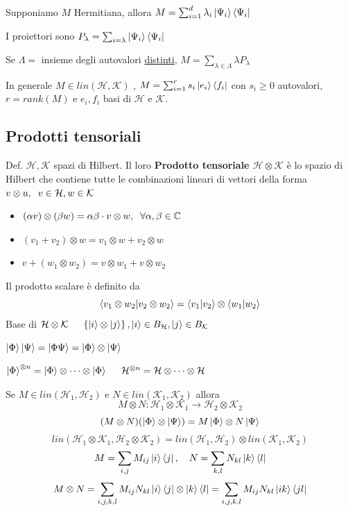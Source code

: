 \documentclass{report}
\begin{document}
\medskip
Supponiamo $M$ Hermitiana, allora $M = \sum^d_{i=1} \lambda_i \ket{\Psi_i}\bra{\Psi_i}$

\medskip
I proiettori sono $P_\lambda = \sum_{i=\lambda} \ket{\Psi_i}\bra{\Psi_i}$

\medskip
Se $\Lambda =$ insieme degli autovalori \underline{distinti}, $M = \sum_{\lambda\in \Lambda} \lambda P_\lambda$ 

\medskip
In generale $M\in\textit{lin}(\mathcal{H,K})$ , $M = \sum^r_{i=1} s_i\ket{e_i}\bra{f_i}$ con $s_i\ge0$ autovalori, $r = \textit{rank}(M)$ e $e_i,f_i$ basi di $\mathcal{H}$ e $\mathcal{K}$.

\subsection{Prodotti tensoriali}
Def. $\mathcal{H,K}$ spazi di Hilbert. Il loro \textbf{Prodotto tensoriale $\mathcal{H} \otimes \mathcal{K}$} è lo spazio di Hilbert che contiene tutte le combinazioni lineari di vettori della forma $v \otimes u, \hspace{0.2cm} v\in\mathcal{H}, w \in \mathcal{K}$
\begin{itemize}
    \item $(\alpha v) \otimes (\beta w) = \alpha\beta \cdot v\otimes w, \hspace{0.2cm} \forall\alpha,\beta \in \mathbb{C}$
    \item $(v_1 + v_2) \otimes w = v_1 \otimes w + v_2 \otimes w$
    \item $v + (w_1 \otimes w_2) = v \otimes w_1 + v \otimes w_2$
\end{itemize}
Il prodotto scalare è definito da
$$\braket{v_1 \otimes w_2 |v_2 \otimes w_2} = \braket{v_1|v_2} \otimes\braket{w_1|w_2}$$
Base di $\mathcal{H} \otimes \mathcal{K} \hspace{0.5cm} \left\{ \ket{i} \otimes\ket{j} \right\}, \ket{i}\in B_\mathcal{H}, \ket{j} \in B_\mathcal{K}$

\medskip
$\ket{\Phi}\ket{\Psi} = \ket{\Phi\Psi} = \ket{\Phi} \otimes \ket{\Psi}$

\medskip
$\ket{\Phi} ^{\otimes n} = \ket{\Phi} \otimes \dots \otimes \ket{\Phi} \hspace{0.5cm} \mathcal{H}^{\otimes n} = \mathcal{H} \otimes\dots\otimes\mathcal{H}$

\medskip
Se $M \in \textit{lin}(\mathcal{H}_1,\mathcal{H}_2)$ e $N \in \textit{lin}(\mathcal{K}_1,\mathcal{K}_2)$ allora
$$M\otimes N : \mathcal{H}_1 \otimes \mathcal{K}_1 \longrightarrow \mathcal{H}_2 \otimes \mathcal{K}_2 $$
$$(M \otimes N) (\ket{ \Phi} \otimes \ket{\Psi}) = M\ket{\Phi} \otimes N \ket{\Psi}$$
$$\textit{lin}(\mathcal{H}_1\otimes\mathcal{K}_1,\mathcal{H}_2\otimes\mathcal{K}_2) = \textit{lin}(\mathcal{H}_1,\mathcal{H}_2) \otimes \textit{lin}(\mathcal{K}_1,\mathcal{K}_2)$$
$$M = \sum_{i,j}M_{ij}\ket{i}\bra{j}, \quad N = \sum_{k,l} N_{kl} \ket{k}\bra{l}$$
$$M \otimes N = \sum_{i,j,k,l} M_{ij} N_{kl}\ket{i}\bra{j} \otimes \ket{k}\bra{l} = \sum_{i,j,k,l} M_{ij} N_{kl}\ket{ik}\bra{jl}$$
\end{document}
